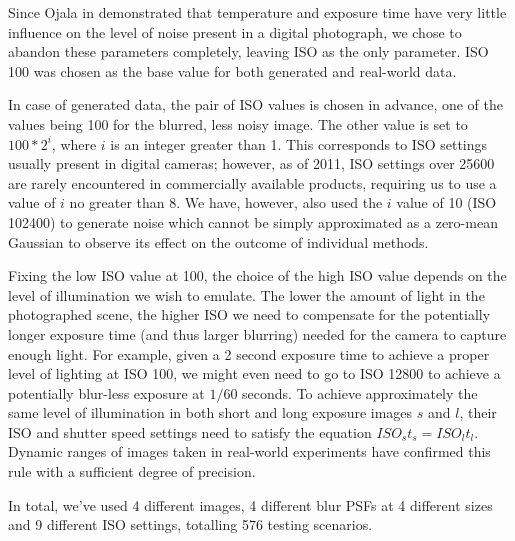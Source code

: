 \documentclass[12pt,notitlepage]{report}
\begin{document}
Since Ojala in \cite{ojal08} demonstrated that temperature and exposure time have very little influence on the level of noise present in a digital photograph, we chose to abandon these parameters completely, leaving ISO as the only parameter. ISO 100 was chosen as the base value for both generated and real-world data. 

In case of generated data, the pair of ISO values is chosen in advance, one of the values being 100 for the blurred, less noisy image. The other value is set to $100*2^i$, where $i$ is an integer greater than 1. This corresponds to ISO settings usually present in digital cameras; however, as of 2011, ISO settings over 25600 are rarely encountered in commercially available products, requiring us to use a value of $i$ no greater than 8. We have, however, also used the $i$ value of 10 (ISO 102400) to generate noise which cannot be simply approximated as a zero-mean Gaussian to observe its effect on the outcome of individual methods.  

Fixing the low ISO value at 100, the choice of the high ISO value depends on the level of illumination we wish to emulate. The lower the amount of light in the photographed scene, the higher ISO we need to compensate for the potentially longer exposure time (and thus larger blurring) needed for the camera to capture enough light. For example, given a 2 second exposure time to achieve a proper level of lighting at ISO 100, we might even need to go to ISO 12800 to achieve a potentially blur-less exposure at $1/60$ seconds. To achieve approximately the same level of illumination in both short and long exposure images $s$ and $l$, their ISO and shutter speed settings need to satisfy the equation $ISO_s t_s = ISO_l t_l$. Dynamic ranges of images taken in real-world experiments have confirmed this rule with a sufficient degree of precision.  

In total, we've used 4 different images, 4 different blur PSFs at 4 different sizes and 9 different ISO settings, totalling 576 testing scenarios. 
\end{document}

